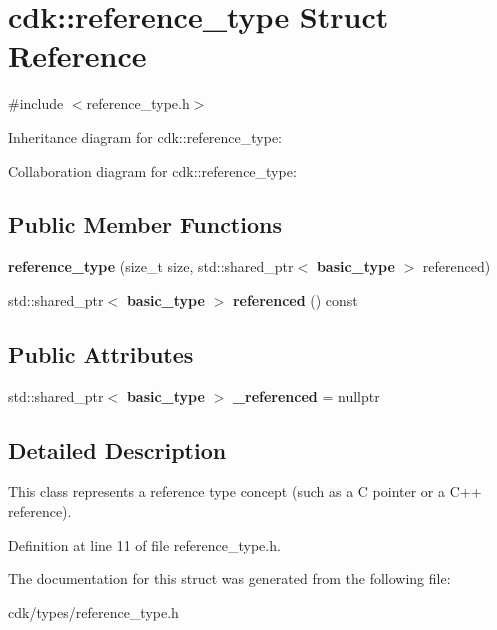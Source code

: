 \section{cdk\+:\+:reference\+\_\+type Struct Reference}
\label{structcdk_1_1reference__type}


{\ttfamily \#include $<$reference\+\_\+type.\+h$>$}



Inheritance diagram for cdk\+:\+:reference\+\_\+type\+:


Collaboration diagram for cdk\+:\+:reference\+\_\+type\+:
\subsection*{Public Member Functions}
\begin{DoxyCompactItemize}
\item 
\mbox{\label{structcdk_1_1reference__type_a3fb5af6f00aaae537608874177eb78cb}} 
{\bfseries reference\+\_\+type} (size\+\_\+t size, std\+::shared\+\_\+ptr$<$ \textbf{ basic\+\_\+type} $>$ referenced)
\item 
\mbox{\label{structcdk_1_1reference__type_af787412c1887935344f4a1762b7dad52}} 
std\+::shared\+\_\+ptr$<$ \textbf{ basic\+\_\+type} $>$ {\bfseries referenced} () const
\end{DoxyCompactItemize}
\subsection*{Public Attributes}
\begin{DoxyCompactItemize}
\item 
\mbox{\label{structcdk_1_1reference__type_a3b2754a518865c71265ed1dfea0fc76e}} 
std\+::shared\+\_\+ptr$<$ \textbf{ basic\+\_\+type} $>$ {\bfseries \+\_\+referenced} = nullptr
\end{DoxyCompactItemize}


\subsection{Detailed Description}
This class represents a reference type concept (such as a C pointer or a C++ reference). 

Definition at line 11 of file reference\+\_\+type.\+h.



The documentation for this struct was generated from the following file\+:\begin{DoxyCompactItemize}
\item 
cdk/types/reference\+\_\+type.\+h\end{DoxyCompactItemize}
